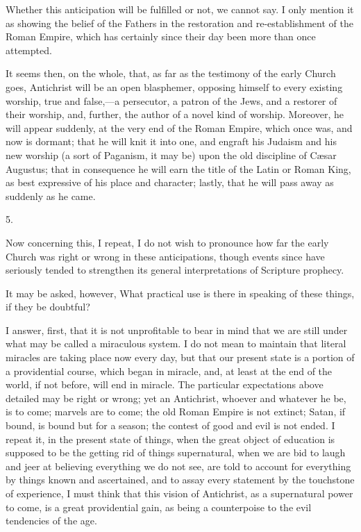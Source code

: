 Whether this anticipation will be fulfilled or not, we cannot say.
I only mention it as showing the belief of the Fathers in the
restoration and re-establishment of the Roman Empire, which has
certainly since their day been more than once attempted.

It seems then, on the whole, that, as far as the testimony of the
early Church goes, Antichrist will be an open blasphemer, opposing
himself to every existing worship, true and false,—a persecutor, a
patron of the Jews, and a restorer of their worship, and, further, the
author of a novel kind of worship. Moreover, he will appear suddenly,
at the very end of the Roman Empire, which once was, and now is
dormant; that he will knit it into one, and engraft his Judaism and
his new worship (a sort of Paganism, it may be) upon the old
discipline of Cæsar Augustus; that in consequence he will earn the
title of the Latin or Roman King, as best expressive of his place and
character; lastly, that he will pass away as suddenly as he came.

5.

Now concerning this, I repeat, I do not wish to pronounce how far
the early Church was right or wrong in these anticipations, though
events since have seriously tended to strengthen its general
interpretations of Scripture prophecy.

It may be asked, however, What practical use is there in speaking
of these things, if they be doubtful?

I answer, first, that it is not unprofitable to bear in mind that
we are still under what may be called a miraculous system. I do not
mean to maintain that literal miracles are taking place now every day,
but that our present state is a portion of a providential course,
which began in miracle, and, at least at the end of the world, if not
before, will end in miracle. The particular expectations above
detailed may be right or wrong; yet an Antichrist, whoever and
whatever he be, is to come; marvels are to come; the old Roman Empire
is not extinct; Satan, if bound, is bound but for a season; the
contest of good and evil is not ended. I repeat it, in the present
state of things, when the great object of education is supposed to be
the getting rid of things supernatural, when we are bid to laugh and
jeer at believing everything we do not see, are told to account for
everything by things known and ascertained, and to assay every
statement by the touchstone of experience, I must think that this
vision of Antichrist, as a supernatural power to come, is a great
providential gain, as being a counterpoise to the evil tendencies of
the age.

